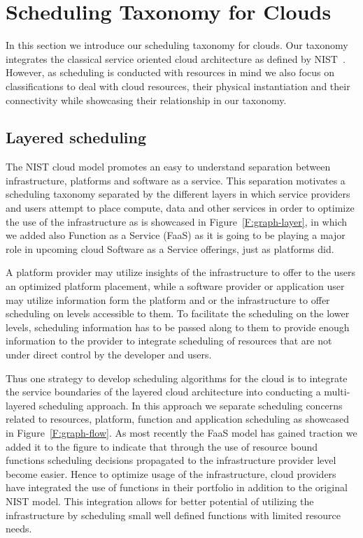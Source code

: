 \documentclass[final,5p,times,twocolumn]{elsarticle}
\begin{document}
\section{Scheduling Taxonomy for Clouds}\label{sec:taxonomy}

In this section we introduce our scheduling taxonomy for clouds. Our
taxonomy integrates the classical service oriented cloud architecture
as defined by NIST~\cite{mell2011nist}. However, as scheduling is
conducted with resources in mind we also focus on classifications to deal with
cloud resources, their physical instantiation and their connectivity
while showcasing their relationship in our taxonomy.

\subsection{Layered scheduling}

The NIST cloud model promotes an easy to understand separation between
infrastructure, platforms and software as a service. This separation
motivates a scheduling taxonomy separated by the different layers in
which service providers and users attempt to place compute, data and
other services in order to optimize the use of the infrastructure as
is showcased in Figure~\ref{F:graph-layer}, in which we added also
Function as a Service (FaaS) as it is going to be playing a major role
in upcoming cloud Software as a Service offerings, just as platforms
did.






A platform provider may utilize insights of the infrastructure to
offer to the users an optimized platform placement, while a software
provider or application user may utilize information form the platform
and or the infrastructure to offer scheduling on levels accessible to
them. To facilitate the scheduling on the lower levels, scheduling
information has to be passed along to them to provide enough
information to the provider to integrate scheduling of resources that
are not under direct control by the developer and users.

Thus one strategy to develop scheduling algorithms for the cloud is to
integrate the service boundaries of the layered cloud architecture
into conducting a multi-layered scheduling approach. In this approach
we separate scheduling concerns related to resources, platform,
function and application scheduling as showcased in
Figure~\ref{F:graph-flow}.  As most recently the FaaS model has gained
traction we added it to the figure to indicate that through the use of
resource bound functions scheduling decisions propagated to the
infrastructure provider level become easier.  Hence to optimize usage
of the infrastructure, cloud providers have integrated the use of
functions in their portfolio in addition to the original NIST model.
This integration allows for better potential of utilizing the
infrastructure by scheduling small well defined functions with limited
resource needs.
\end{document}
